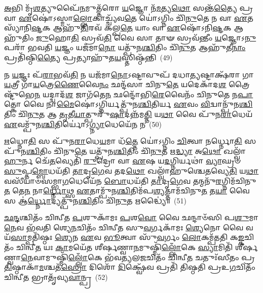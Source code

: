 \-\ul{𑌅}\-𑌭𑌿 𑌮𑍃᳴\-\ul{𑌶}\-𑌤𑍍𑌯𑍁𑌪𑍈᳴\-\ul{𑌨}\-𑌮𑍁𑌤𑍍𑌤᳴𑌰𑍋 \ul{𑌯}\-𑌜𑍍𑌞𑍋 𑌨᳴\-\ul{𑌮}\-𑌤𑍍𑌯\-\ul{𑌥𑍋} 𑌸𑌨𑍍𑌤᳴\-\ul{𑌤𑍍𑌯𑍈} 𑌪𑍍𑌰 𑌵𑌾 \ul{𑌏}\-𑌷𑍋॑\-𑌽𑌸𑍍𑌮𑌾\-\ul{𑌲𑍍𑌲𑍋}\-𑌕𑌾𑌚𑍍𑌚𑍍𑌯᳴𑌵\-\ul{𑌤𑍇} 𑌯𑍋॑\-𑌽𑌗𑍍𑌨𑌿𑌂 𑌚𑌿᳴\-\ul{𑌨𑍁}\-𑌤𑍇 𑌨 𑌵𑌾 \ul{𑌏}\-𑌤𑌸𑍍𑌯𑌾᳴𑌨𑌿\-\ul{𑌷𑍍𑌟}\-𑌕 𑌆𑌹𑍁᳴\-\ul{𑌤𑌿}\-𑌰𑌵᳴ 𑌕𑌲𑍍𑌪\-\ul{𑌤𑍇} 𑌯𑌾𑌂 𑌵𑌾 \ul{𑌏}\-𑌷𑍋᳴\-𑌽𑌨𑌿\-\ul{𑌷𑍍𑌟}\-𑌕 𑌆𑌹𑍁᳴𑌤𑌿𑌂 \ul{𑌜𑍁}\-𑌹𑍋\-\ul{𑌤𑌿} 𑌸𑍍𑌰𑌵᳴\-\ul{𑌤𑌿} 𑌵𑍈 𑌸𑌾 𑌤𑌾𑍟 𑌸𑍍𑌰𑌵᳴𑌨𑍍𑌤𑍀𑌂 \ul{𑌯}\-𑌜𑍍𑌞𑍋\-𑌽\-\ul{𑌨𑍁} 𑌪𑌰𑌾᳴ 𑌭𑌵𑌤𑌿 \ul{𑌯}\-𑌜𑍍𑌞𑌂 𑌯𑌜᳴𑌮𑌾\-\ul{𑌨𑍋} 𑌯𑌤𑍍𑌪𑍁᳴𑌨\-\ul{𑌶𑍍𑌚𑌿}\-𑌤𑌿𑌂 𑌚𑌿᳴\-\ul{𑌨𑍁}\-𑌤 𑌆𑌹𑍁᳴𑌤𑍀\-\ul{𑌨𑌾𑌂} 𑌪𑍍𑌰𑌤𑌿᳴𑌷𑍍𑌠𑌿\-\ul{𑌤𑍍𑌯𑍈} 𑌪𑍍𑌰𑌤𑍍𑌯𑌾𑌹𑍁᳴𑌤\-\ul{𑌯}\-𑌸𑍍𑌤𑌿𑌷𑍍𑌠᳴𑌨𑍍𑌤𑌿~(49)

𑌨 \ul{𑌯}\-𑌜𑍍𑌞𑌃 𑌪᳴\-\ul{𑌰𑌾}\-𑌭𑌵᳴\-\ul{𑌤𑌿} 𑌨 𑌯𑌜᳴𑌮𑌾\-\ul{𑌨𑍋}\-\-𑌽𑌷𑍍𑌟𑌾𑌵𑍁𑌪᳴ 𑌦𑌧𑌾\-\ul{𑌤𑍍𑌯}\-𑌷𑍍𑌟𑌾𑌕𑍍𑌷᳴𑌰𑌾 𑌗𑌾\-\ul{𑌯}\-𑌤𑍍𑌰𑍀 𑌗𑌾᳴\-\ul{𑌯}\-𑌤𑍍𑌰𑍇\-\ul{𑌣𑍈}\-𑌵𑍈\-\ul{𑌨𑌂} 𑌛𑌨𑍍𑌦᳴𑌸𑌾 𑌚𑌿𑌨𑍁\-\ul{𑌤𑍇} 𑌯𑌦𑍇𑌕𑌾᳴\-𑌦\-\ul{𑌶} 𑌤𑍍𑌰𑍈𑌷𑍍𑌟𑍁᳴𑌭𑍇\-\ul{𑌨} 𑌯𑌦𑍍𑌦𑍍𑌵𑌾𑌦᳴\-\ul{𑌶} 𑌜𑌾𑌗᳴𑌤𑍇\-\ul{𑌨} 𑌛𑌨𑍍𑌦𑍋᳴𑌭𑌿\-\ul{𑌰𑍇}\-𑌵𑍈𑌨𑌂᳴ 𑌚𑌿𑌨𑍁𑌤𑍇 𑌨\-\ul{𑌪𑌾}\-𑌤𑍍𑌕𑍋 𑌵𑍈 𑌨𑌾\-\ul{𑌮𑍈}\-𑌷𑍋॑\-𑌽𑌗𑍍𑌨𑌿𑌰𑍍𑌯𑌤𑍍𑌪𑍁᳴𑌨\-\ul{𑌶𑍍𑌚𑌿}\-𑌤𑌿𑌰𑍍𑌯 \ul{𑌏}\-𑌵𑌂 \ul{𑌵𑌿}\-𑌦𑍍𑌵𑌾𑌨𑍍𑌪𑍁᳴𑌨\-\ul{𑌶𑍍𑌚𑌿}\-𑌤𑌿𑌂 𑌚𑌿᳴\-\ul{𑌨𑍁}\-𑌤 𑌆 \ul{𑌤𑍃}\-𑌤𑍀\-\ul{𑌯𑌾}\-𑌤𑍍𑌪𑍁𑌰𑍁᳴\-\ul{𑌷𑌾}\-𑌦𑌨𑍍𑌨᳴𑌮\-\ul{𑌤𑍍𑌤𑌿} 𑌯\-\ul{𑌥𑌾} 𑌵𑍈 𑌪𑍁᳴𑌨\-\ul{𑌰𑌾}\-𑌧𑍇𑌯᳴ \ul{𑌏}\-𑌵𑌮𑍍𑌪𑍁᳴𑌨\-\ul{𑌶𑍍𑌚𑌿}\-𑌤𑌿𑌰𑍍𑌯𑍋॑\-𑌽\-\ul{𑌗𑍍𑌨𑍍𑌯𑌾}\-𑌧𑍇𑌯𑍇᳴\-\ul{𑌨} 𑌨~(50)

\-\ul{𑌋}\-𑌧𑍍𑌨𑍋\-\ul{𑌤𑌿} 𑌸 𑌪𑍁᳴𑌨\-\ul{𑌰𑌾}\-𑌧𑍇\-\ul{𑌯}\-𑌮𑌾 𑌧᳴\-\ul{𑌤𑍍𑌤𑍇} 𑌯𑍋॑\-𑌽𑌗𑍍𑌨𑌿𑌂 \ul{𑌚𑌿}\-𑌤𑍍𑌵𑌾 𑌨𑌰𑍍𑌧𑍍𑌨𑍋\-\ul{𑌤𑌿} 𑌸 𑌪𑍁᳴𑌨\-\ul{𑌶𑍍𑌚𑌿}\-𑌤𑌿𑌂 𑌚𑌿᳴𑌨𑍁\-\ul{𑌤𑍇} 𑌯𑌤𑍍𑌪𑍁᳴𑌨\-\ul{𑌶𑍍𑌚𑌿}\-𑌤𑌿𑌂 𑌚𑌿᳴\-\ul{𑌨𑍁}\-𑌤 𑌋\-\ul{𑌦𑍍𑌧𑍍𑌯𑌾} 𑌅\-\ul{𑌥𑍋} 𑌖𑌲𑍍𑌵𑌾᳴\-\ul{𑌹𑍁}\-𑌰𑍍𑌨 𑌚𑍇᳴\-\ul{𑌤}\-𑌵𑍍𑌯𑍇𑌤𑌿᳴ \ul{𑌰𑍁}\-𑌦𑍍𑌰𑍋 𑌵𑌾 \ul{𑌏}\-𑌷 𑌯\-\ul{𑌦}\-𑌗𑍍𑌨𑌿𑌰𑍍𑌯𑌥𑌾॑ \ul{𑌵𑍍𑌯𑌾}\-𑌘𑍍𑌰𑍞 \ul{𑌸𑍁}\-𑌪𑍍𑌤\-\ul{𑌮𑍍𑌬𑍋}\-𑌧𑌯᳴𑌤𑌿 \ul{𑌤𑌾}\-𑌦𑍃\-\ul{𑌗𑍇}\-𑌵 𑌤𑌦\-\ul{𑌥𑍋} 𑌖𑌲𑍍𑌵𑌾᳴𑌹𑍁𑌶𑍍𑌚𑍇\-\ul{𑌤}\-𑌵𑍍𑌯𑍇\-\ul{𑌤𑌿} 𑌯\-\ul{𑌥𑌾} 𑌵𑌸𑍀᳴𑌯𑌾𑍞𑌸𑌮𑍍𑌭𑌾\-\ul{𑌗}\-𑌧𑍇𑌯𑍇᳴𑌨 \ul{𑌬𑍋}\-𑌧𑌯᳴𑌤𑌿 \ul{𑌤𑌾}\-𑌦𑍃\-\ul{𑌗𑍇}\-𑌵 𑌤𑌨𑍍𑌮𑌨𑍁᳴\-\ul{𑌰}\-𑌗𑍍𑌨𑌿𑌮᳴𑌚𑌿𑌨𑍁\-\ul{𑌤} 𑌤𑍇\-\ul{𑌨} 𑌨𑌾\-\ul{𑌰𑍍𑌧𑍍𑌨𑍋}\-𑌥𑍍𑌸 \ul{𑌏}\-𑌤𑌾𑌮𑍍𑌪𑍁᳴𑌨\-\ul{𑌶𑍍𑌚𑌿}\-𑌤𑌿𑌮᳴𑌪\-\ul{𑌶𑍍𑌯}\-𑌤𑍍𑌤𑌾𑌮᳴𑌚𑌿𑌨𑍁\-\ul{𑌤} 𑌤\-\ul{𑌯𑌾} 𑌵𑍈 𑌸 𑌆॑\-\ul{𑌰𑍍𑌧𑍍𑌨𑍋}\-𑌦𑍍𑌯𑌤𑍍𑌪𑍁᳴𑌨\-\ul{𑌶𑍍𑌚𑌿}\-𑌤𑌿𑌂 𑌚𑌿᳴\-\ul{𑌨𑍁}\-𑌤 𑌋𑌦𑍍𑌧𑍍𑌯𑍈॑॥~(51)

{\anuvakamend[{\-\ul{𑌤𑍍𑌰𑌿}\-𑌵𑍃𑌦\-\ul{𑌥} 𑌤𑌿𑌷𑍍𑌠᳴𑌨𑍍𑌤𑍍𑌯\-\ul{𑌗𑍍𑌨𑍍𑌯𑌾}\-𑌧𑍇𑌯𑍇᳴\-\ul{𑌨} 𑌨𑌾𑌚𑌿᳴𑌨𑍁𑌤 \ul{𑌸}\-𑌪𑍍𑌤𑌦᳴𑌶 𑌚}]}%

\-\ul{𑌛}\-\-\ul{𑌨𑍍𑌦}\-𑌶𑍍𑌚𑌿𑌤𑌂᳴ 𑌚𑌿𑌨𑍍𑌵𑍀𑌤 \ul{𑌪}\-𑌶𑍁𑌕𑌾᳴𑌮𑌃 \ul{𑌪}\-𑌶\-\ul{𑌵𑍋} 𑌵𑍈 𑌛𑌨𑍍𑌦𑌾𑍞᳴𑌸𑌿 𑌪\-\ul{𑌶𑍁}\-𑌮𑌾\-\ul{𑌨𑍇}\-𑌵 𑌭᳴𑌵𑌤𑌿 𑌶𑍍𑌯𑍇\-\ul{𑌨}\-𑌚𑌿𑌤𑌂᳴ 𑌚𑌿𑌨𑍍𑌵𑍀𑌤 𑌸𑍁\-\ul{𑌵}\-𑌰𑍍𑌗𑌕𑌾᳴𑌮𑌃 \ul{𑌶𑍍𑌯𑍇}\-𑌨𑍋 𑌵𑍈 𑌵𑌯᳴\-\ul{𑌸𑌾}\-𑌮𑍍𑌪𑌤𑌿᳴𑌷𑍍𑌠𑌃 \ul{𑌶𑍍𑌯𑍇}\-𑌨 \ul{𑌏}\-𑌵 \ul{𑌭𑍂}\-𑌤𑍍𑌵𑌾 𑌸𑍁᳴\-\ul{𑌵}\-𑌰𑍍𑌗𑌂 \ul{𑌲𑍋}\-𑌕𑌮𑍍𑌪᳴𑌤𑌤𑌿 𑌕\-\ul{𑌙𑍍𑌕}\-𑌚𑌿𑌤𑌂᳴ 𑌚𑌿𑌨𑍍𑌵𑍀\-\ul{𑌤} 𑌯𑌃 \ul{𑌕𑌾}\-𑌮𑌯𑍇᳴𑌤 𑌶𑍀𑌰𑍍\mbox{}\-\ul{𑌷}\-𑌣𑍍𑌵𑌾\-\ul{𑌨}\-𑌮𑍁𑌷𑍍𑌮𑌿᳴\-\ul{𑌲𑍍𑌲𑍋𑌁}\-𑌕𑍇 \ul{𑌸𑍍𑌯𑌾}\-𑌮𑌿𑌤𑌿᳴ 𑌶𑍀𑌰𑍍\mbox{}\-\ul{𑌷}\-𑌣𑍍𑌵𑌾\-\ul{𑌨𑍇}\-𑌵𑌾𑌮𑍁𑌷𑍍𑌮𑌿᳴\-\ul{𑌲𑍍𑌲𑍋𑌁}\-𑌕𑍇 𑌭᳴𑌵𑌤𑍍𑌯𑌲\-\ul{𑌜}\-𑌚𑌿𑌤𑌂᳴ 𑌚𑌿𑌨𑍍𑌵𑍀\-\ul{𑌤} 𑌚𑌤𑍁𑌃᳴𑌸𑍀𑌤𑌂 𑌪𑍍𑌰\-\ul{𑌤𑌿}\-𑌷𑍍𑌠𑌾𑌕𑌾᳴\-\ul{𑌮}\-𑌶𑍍𑌚𑌤᳴\-\ul{𑌸𑍍𑌰𑍋} 𑌦𑌿𑌶𑍋᳴ \ul{𑌦𑌿}\-𑌕𑍍𑌷𑍍𑌵𑍇᳴𑌵 𑌪𑍍𑌰𑌤𑌿᳴ 𑌤𑌿𑌷𑍍𑌠𑌤𑌿 𑌪𑍍𑌰𑌉\-\ul{𑌗}\-𑌚𑌿𑌤𑌂᳴ 𑌚𑌿𑌨𑍍𑌵𑍀\-\ul{𑌤} 𑌭𑍍𑌰𑌾𑌤𑍃᳴𑌵𑍍𑌯\-\ul{𑌵𑌾}\-𑌨𑍍𑌪𑍍𑌰~(52)

